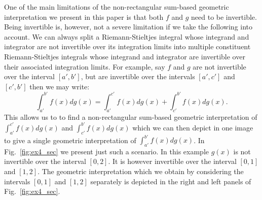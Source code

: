 \documentclass{article}
\theoremstyle{theorem}
\theoremstyle{definition}
\begin{document}
\noindent
One of the main limitations of the non-rectangular sum-based geometric interpretation we present in this paper is that both $f$ and $g$ need to be invertible.
Being invertible is, however, not a severe limitation if we take the following into account. We can always split a Riemann-Stieltjes
integral whose integrand and integrator are not invertible over its integration limits into multiple constituent Riemann-Stieltjes integrals whose 
integrand and integrator are invertible over their associated integration limits. For example, say 
$f$ and $g$ are not invertible over the interval $[a',b']$, but are invertible over the intervals $[a',c']$ and 
$[c',b']$ then we may write:
\begin{equation}
\int_{a'}^{b'}f(x)dg(x) = \int_{a'}^{c'}f(x)dg(x) + \int_{c'}^{b'} f(x)dg(x).
\end{equation}
This allows us to to find a non-rectangular sum-based geometric interpretation of $\int_{a'}^{c'}f(x)dg(x)$ and $\int_{c'}^{b'} f(x)dg(x)$
which we can then depict in one image to give a single geometric interpretation of $\int_{a'}^{b'}f(x)dg(x)$.
In Fig.~\ref{fig:ex4_sec} we present just such a scenario. In this example $g(x)$ is not invertible over the interval 
$[0,2]$. It is however invertible over the interval $[0,1]$ and $[1,2]$. The geometric interpretation which we 
obtain by considering the intervals $[0,1]$ and $[1,2]$ separately is depicted in the 
right and left panels of Fig.~\ref{fig:ex4_sec}.

\end{document}
